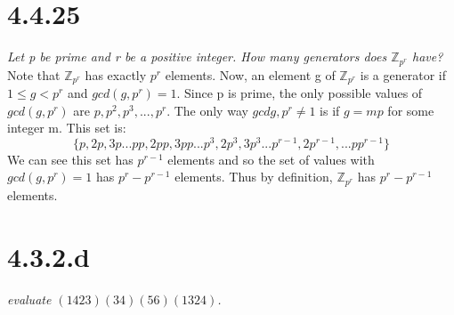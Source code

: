 \documentclass[a4paper, 11pt]{article}
\begin{document}
\section*{4.4.25}
\textit{Let p be prime and r be a positive integer. How many generators does $\mathbb{Z}_{p^r}$ have?} \\ 

\noindent Note that $\mathbb{Z}_{p^r}$ has exactly $p^r$ elements. Now, an element g of $\mathbb{Z}_{p^r}$ is a generator if $1 \leq g < p^r$ and $gcd(g, p^r)=1$. Since p is prime, the only possible values of $gcd(g, p^r)$ are $p, p^2, p^3, ..., p^r$. The only way $gcd{g, p^r}\neq 1$ is if $g = mp$ for some integer m. This set is: 
	\begin{equation*}
		\{p, 2p, 3p...pp, 2pp, 3pp...p^3, 2p^3, 3p^3...p^{r-1}, 2p^{r-1}, ...pp^{r-1}\}
	\end{equation*} 
We can see this set has $p^{r-1}$ elements and so the set of values with $gcd(g, p^r) = 1$ has $p^r-p^{r-1}$ elements. Thus by definition, $\mathbb{Z}_{p^r}$ has $p^r-p^{r-1}$ elements.\\ 

\section*{4.3.2.d}
\textit{evaluate $(1423)(34)(56)(1324)$.} \\ 
\end{document}
